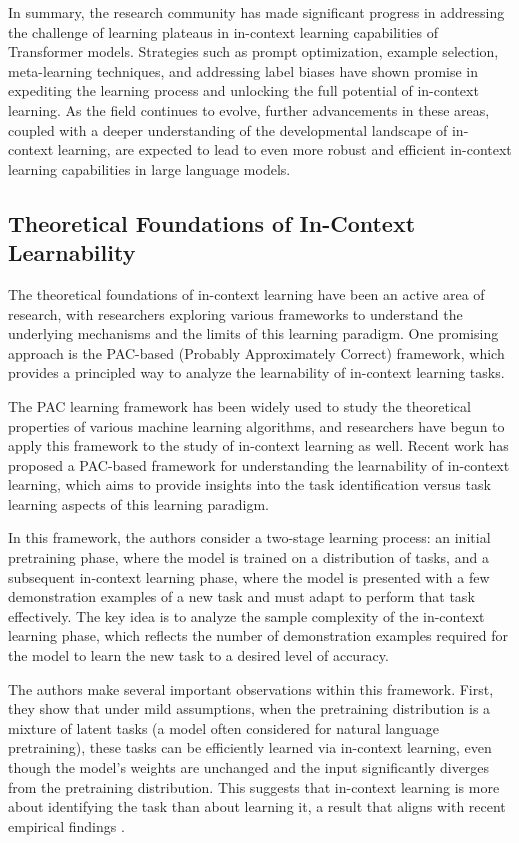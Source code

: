 \documentclass[11pt]{article}
\begin{document}
In summary, the research community has made significant progress in addressing the challenge of learning plateaus in in-context learning capabilities of Transformer models. Strategies such as prompt optimization, example selection, meta-learning techniques, and addressing label biases have shown promise in expediting the learning process and unlocking the full potential of in-context learning. As the field continues to evolve, further advancements in these areas, coupled with a deeper understanding of the developmental landscape of in-context learning, are expected to lead to even more robust and efficient in-context learning capabilities in large language models.

\subsection{Theoretical Foundations of In-Context Learnability}

The theoretical foundations of in-context learning have been an active area of research, with researchers exploring various frameworks to understand the underlying mechanisms and the limits of this learning paradigm. One promising approach is the PAC-based (Probably Approximately Correct) framework, which provides a principled way to analyze the learnability of in-context learning tasks.

The PAC learning framework has been widely used to study the theoretical properties of various machine learning algorithms, and researchers have begun to apply this framework to the study of in-context learning as well. Recent work \cite{ref13} has proposed a PAC-based framework for understanding the learnability of in-context learning, which aims to provide insights into the task identification versus task learning aspects of this learning paradigm.

In this framework, the authors consider a two-stage learning process: an initial pretraining phase, where the model is trained on a distribution of tasks, and a subsequent in-context learning phase, where the model is presented with a few demonstration examples of a new task and must adapt to perform that task effectively. The key idea is to analyze the sample complexity of the in-context learning phase, which reflects the number of demonstration examples required for the model to learn the new task to a desired level of accuracy.

The authors make several important observations within this framework. First, they show that under mild assumptions, when the pretraining distribution is a mixture of latent tasks (a model often considered for natural language pretraining), these tasks can be efficiently learned via in-context learning, even though the model's weights are unchanged and the input significantly diverges from the pretraining distribution. This suggests that in-context learning is more about identifying the task than about learning it, a result that aligns with recent empirical findings \cite{ref105,ref106}.
\end{document}
